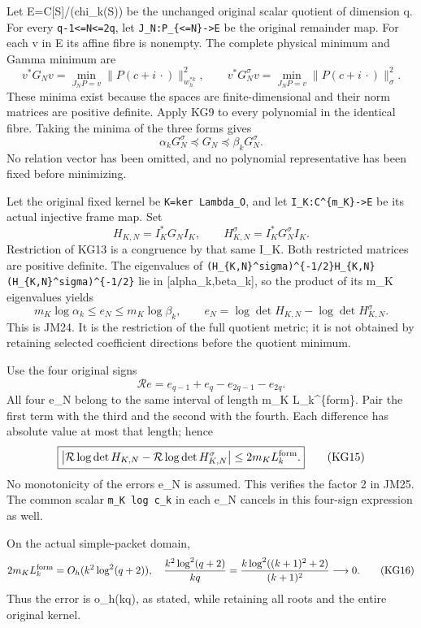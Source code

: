 \documentclass[11pt]{article}
\begin{document}
Let E=C{[}S{]}/(chi\_k(S)) be the unchanged original scalar quotient of dimension q. For every \texttt{q-1\textless{}=N\textless{}=2q}, let \texttt{J\_N:P\_\{\textless{}=N\}-\textgreater{}E} be the original remainder map. For each v in E its affine fibre is nonempty. The complete physical minimum and Gamma minimum are \[
v^*G_Nv=\min_{J_NP=v}\|P(c+i\,\cdot)\|_{w_h^{*k}}^2,
\qquad
v^*G_N^\sigma v=\min_{J_NP=v}\|P(c+i\,\cdot)\|_\sigma^2.
\tag{KG12}
\] These minima exist because the spaces are finite-dimensional and their norm matrices are positive definite. Apply KG9 to every polynomial in the identical fibre. Taking the minima of the three forms gives \[
\alpha_kG_N^\sigma\preceq G_N\preceq\beta_kG_N^\sigma.
\tag{KG13}
\] No relation vector has been omitted, and no polynomial representative has been fixed before minimizing.

Let the original fixed kernel be \texttt{K=ker\ Lambda\_O}, and let \texttt{I\_K:C\^{}\{m\_K\}-\textgreater{}E} be its actual injective frame map. Set \[
H_{K,N}=I_K^*G_NI_K,\qquad
H_{K,N}^\sigma=I_K^*G_N^\sigma I_K.
\] Restriction of KG13 is a congruence by that same I\_K. Both restricted matrices are positive definite. The eigenvalues of \texttt{(H\_\{K,N\}\^{}sigma)\^{}\{-1/2\}H\_\{K,N\}(H\_\{K,N\}\^{}sigma)\^{}\{-1/2\}} lie in {[}alpha\_k,beta\_k{]}, so the product of its m\_K eigenvalues yields \[
m_K\log\alpha_k\le e_N\le m_K\log\beta_k,\qquad
e_N=\log\det H_{K,N}-\log\det H_{K,N}^\sigma.
\tag{KG14}
\] This is JM24. It is the restriction of the full quotient metric; it is not obtained by retaining selected coefficient directions before the quotient minimum.

Use the four original signs \[
\mathcal Re=e_{q-1}+e_q-e_{2q-1}-e_{2q}.
\] All four e\_N belong to the same interval of length m\_K L\_k\^{}\{form\}. Pair the first term with the third and the second with the fourth. Each difference has absolute value at most that length; hence \[
\boxed{\left|\mathcal R\log\det H_{K,N}
-\mathcal R\log\det H_{K,N}^\sigma\right|
\le2m_KL_k^{\rm form}.}
\tag{KG15}
\] No monotonicity of the errors e\_N is assumed. This verifies the factor 2 in JM25. The common scalar \texttt{m\_K\ log\ c\_k} in each e\_N cancels in this four-sign expression as well.

On the actual simple-packet domain, \[
2m_KL_k^{\rm form}=O_h(k^2\log^2(q+2)),\quad
\frac{k^2\log^2(q+2)}{kq}
=\frac{k\log^2((k+1)^2+2)}{(k+1)^2}\longrightarrow0.
\tag{KG16}
\] Thus the error is o\_h(kq), as stated, while retaining all roots and the entire original kernel.
\end{document}
